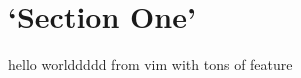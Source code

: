 \documentclass{article}
\begin{document}
\section{`Section One'}
hello worlddddd from vim with tons of feature
\end{document}

